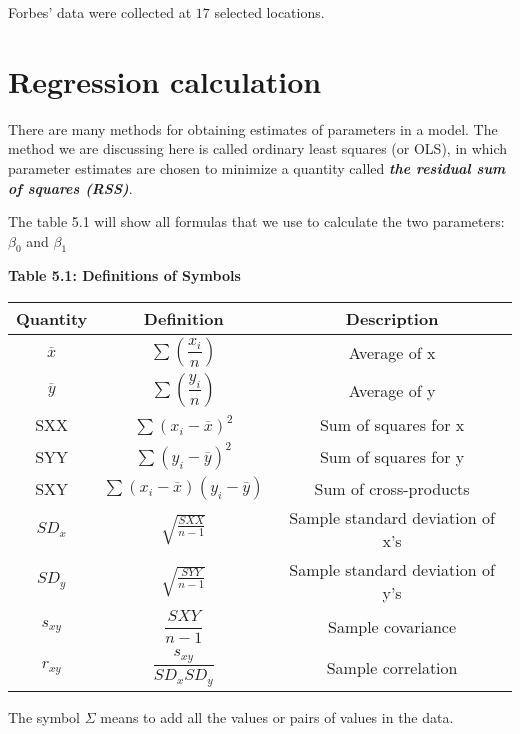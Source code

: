 \documentclass{article}
\begin{document}
    Forbes’ data were collected at $17$ selected locations.
    
\section{Regression calculation} 
    There are many methods for obtaining estimates of parameters in a model. The method we are discussing here is called ordinary least squares (or OLS), in which parameter estimates are chosen to minimize a quantity called \textit{\textbf{the residual sum of squares (RSS)}}.
    
    The table 5.1 will show all formulas that we use to calculate the two parameters: ${\beta_{0}}$ and ${\beta_{1}}$
    
    \begin{center}
        \textbf{Table 5.1: Definitions of Symbols}
        \begin{tabular}{|c|c|c|}
            \hline 
            Quantity & Definition & Description\\ 
            \hline 
            $\overline{x}$ & ${\displaystyle \sum \left(\dfrac{x_{i}}{n}\right)}$ & Average of x \\  
            \hline 
            $\overline{y}$ & ${\displaystyle \sum \left(\dfrac{y_{i}}{n}\right)}$ & Average of y \\
            \hline 
            SXX & ${\displaystyle \sum {\left(x_{i} - \overline{x}\right)}^2}$ & Sum of squares for x \\
            \hline 
            SYY & ${\displaystyle \sum {\left(y_{i} - \overline{y}\right)}^2}$ & Sum of squares for y \\
            \hline
            SXY & ${\displaystyle \sum (x_{i} - \overline{x})(y_{i} - \overline{y})}$ & Sum of cross-products \\
            \hline
            ${SD_{x}}$ & ${\sqrt{\frac{SXX}{n - 1}}}$ & Sample standard deviation of x’s \\
            \hline 
            ${SD_{y}}$ & ${\sqrt{\frac{SYY}{n - 1}}}$ & Sample standard deviation of y’s \\
            \hline 
            ${s_{xy}}$ & ${\dfrac{SXY}{n - 1}}$ & Sample covariance \\ 
            \hline 
            ${r_{xy}}$ & ${\dfrac{s_{xy}}{SD_{x} SD_{y}}}$ & Sample correlation \\ 
            \hline
        \end{tabular}
        
        \vspace{\baselineskip}
        The symbol ${\Sigma}$ means to add all the values or pairs of values in the data. 
    \end{center}
    
\end{document}
